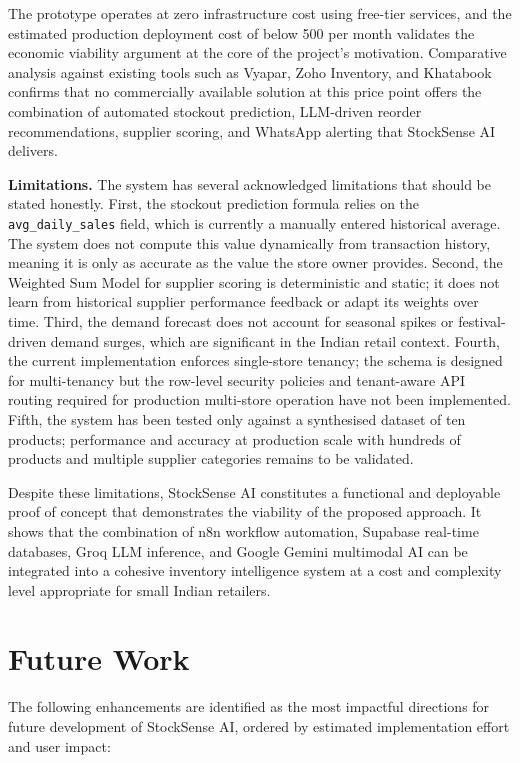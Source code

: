 The prototype operates at zero infrastructure cost using free-tier services, and the estimated
production deployment cost of below \rupee{}500 per month validates the economic viability
argument at the core of the project's motivation. Comparative analysis against existing tools
such as Vyapar, Zoho Inventory, and Khatabook confirms that no commercially available solution
at this price point offers the combination of automated stockout prediction, LLM-driven reorder
recommendations, supplier scoring, and WhatsApp alerting that StockSense AI delivers.

\textbf{Limitations.} The system has several acknowledged limitations that should be stated
honestly. First, the stockout prediction formula relies on the \texttt{avg\_daily\_sales} field,
which is currently a manually entered historical average. The system does not compute this
value dynamically from transaction history, meaning it is only as accurate as the value the
store owner provides. Second, the Weighted Sum Model for supplier scoring is deterministic
and static; it does not learn from historical supplier performance feedback or adapt its
weights over time. Third, the demand forecast does not account for seasonal spikes or
festival-driven demand surges, which are significant in the Indian retail context. Fourth,
the current implementation enforces single-store tenancy; the schema is designed for
multi-tenancy but the row-level security policies and tenant-aware API routing required for
production multi-store operation have not been implemented. Fifth, the system has been tested
only against a synthesised dataset of ten products; performance and accuracy at production
scale with hundreds of products and multiple supplier categories remains to be validated.

Despite these limitations, StockSense AI constitutes a functional and deployable proof of
concept that demonstrates the viability of the proposed approach. It shows that the combination
of n8n workflow automation, Supabase real-time databases, Groq LLM inference, and Google
Gemini multimodal AI can be integrated into a cohesive inventory intelligence system at a
cost and complexity level appropriate for small Indian retailers.

\section{Future Work}

The following enhancements are identified as the most impactful directions for future
development of StockSense AI, ordered by estimated implementation effort and user impact:

